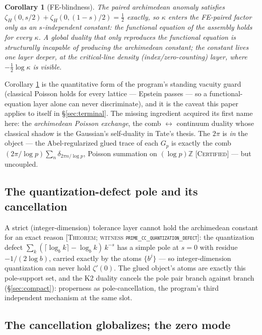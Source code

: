 \documentclass[11pt,reqno]{amsart}
\theoremstyle{plain}
\newtheorem{corollary}[theorem]{Corollary}
\theoremstyle{definition}
\theoremstyle{remark}
\newcommand{\Z}{\mathbb{Z}}
\newcommand{\grade}[1]{\textup{[\textsc{#1}]}}
\begin{document}
\begin{corollary}[FE-blindness]\label{cor:feblind}
The paired archimedean anomaly satisfies
$\zeta_H(0, s/2) + \zeta_H(0, (1-s)/2) = \tfrac12$ exactly, so $\kappa$ enters the
FE-paired factor only as an $s$-independent constant: \emph{the functional equation of the
assembly holds for every $\kappa$}. A global duality that only reproduces the functional
equation is structurally incapable of producing the archimedean constant; the constant lives
one layer deeper, at the critical-line density (index/zero-counting) layer, where
$-\tfrac12\log\kappa$ is visible.
\end{corollary}

Corollary \ref{cor:feblind} is the quantitative form of the program's standing vacuity guard
(classical Poisson holds for every lattice --- Epstein passes --- so a functional-equation
layer alone can never discriminate), and it is the caveat this paper applies to itself in
\S\ref{sec:terminal}. The missing ingredient acquired its first name here: the
\emph{archimedean Poisson exchange}, the comb $\leftrightarrow$ continuum duality whose
classical shadow is the Gaussian's self-duality in Tate's thesis. The $2\pi$ is \emph{in}
the object --- the Abel-regularized glued trace of each $G_p$ is exactly the comb
$(2\pi/\log p)\sum_n \delta_{2\pi n/\log p}$, Poisson summation on $(\log p)\Z$
\grade{Certified} --- but uncoupled.

\subsection{The quantization-defect pole and its cancellation}

A strict (integer-dimension) tolerance layer cannot hold the archimedean constant for an
exact reason \grade{Theorem; witness \texttt{prime\_\allowbreak cc\_\allowbreak quantization\_\allowbreak defect}}: the
quantization defect $\sum_k (\lceil \log_b k\rceil - \log_b k)\, k^{-s}$ has a simple pole at
$s = 0$ with residue $-1/(2\log b)$, carried exactly by the atoms $\{b^j\}$ --- so
integer-dimension quantization can never hold $\zeta'(0)$. The glued object's atoms are
exactly this pole-support set, and the K2 duality cancels the pole pair branch against
branch (\S\ref{sec:compact}): properness as pole-cancellation, the program's third
independent mechanism at the same slot.

\subsection{The cancellation globalizes; the zero mode}
\end{document}
